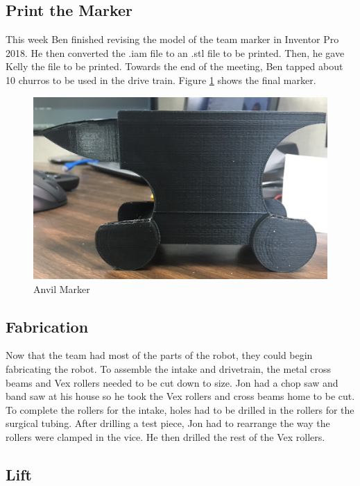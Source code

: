 \documentclass{article}
\newif\ifcontents
\begin{document}
\contentsfalse

\subsection{Print the Marker}
This week Ben finished revising the model of the team marker in Inventor Pro 2018. He then converted the .iam file to an .stl file to be printed. Then, he gave Kelly the file to be printed. Towards the end of the meeting, Ben tapped about 10 churros to be used in the drive train. Figure \ref{fig:marker} shows the final marker. 

\begin{figure}
    \centering
    \includegraphics[width=.6 \textwidth]{09_10-29/images/anvil_marker.jpg}
    \caption{Anvil Marker}
    \label{fig:marker}
\end{figure}

\subsection{Fabrication}
Now that the team had most of the parts of the robot, they could begin fabricating the robot. To assemble the intake and drivetrain, the metal cross beams and Vex rollers needed to be cut down to size. Jon had a chop saw and band saw at his house so he took the Vex rollers and cross beams home to be cut. To complete the rollers for the intake, holes had to be drilled in the rollers for the surgical tubing. After drilling a test piece, Jon had to rearrange the way the rollers were clamped in the vice. He then drilled the rest of the Vex rollers.
\subsection{Lift }
\end{document}
